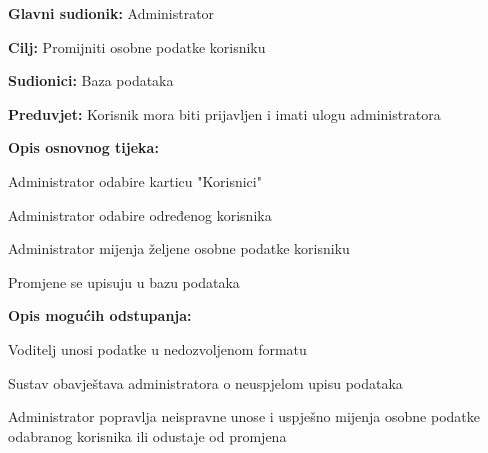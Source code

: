 					\noindent {}
					\begin{packed_item}
						
						\item \textbf{Glavni sudionik: }Administrator
						\item  \textbf{Cilj:} Promijniti osobne podatke korisniku
						\item  \textbf{Sudionici:} Baza podataka
						\item  \textbf{Preduvjet:} Korisnik mora biti prijavljen i imati ulogu administratora
						\item  \textbf{Opis osnovnog tijeka:}
						
						\item[] \begin{packed_enum}
							
							\item Administrator odabire karticu "Korisnici"
							\item Administrator odabire određenog korisnika
							\item Administrator mijenja željene osobne podatke korisniku
							\item Promjene se upisuju u bazu podataka
						\end{packed_enum}
						
						\item  \textbf{Opis mogućih odstupanja:}
						
						\item[] \begin{packed_item}
							
							\item[3.a] Voditelj unosi podatke u nedozvoljenom formatu
							\item[] \begin{packed_enum}
								
								\item Sustav obavještava administratora o neuspjelom upisu podataka
								\item Administrator popravlja neispravne unose i uspješno mijenja osobne podatke odabranog korisnika ili odustaje od promjena
								
							\end{packed_enum}
						\end{packed_item}
					\end{packed_item}
				
